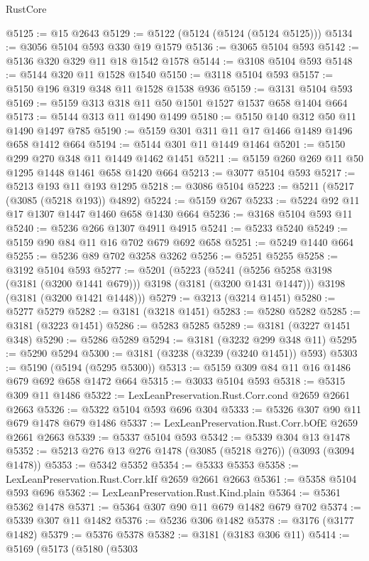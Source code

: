 \begin{lexlean}{RustCore}
\begin{coremodule}
@5125 := @15 @2643
@5129 := @5122 (@5124 (@5124 (@5124 @5125)))
@5134 := @3056 @5104 @593 @330 @19 @1579
@5136 := @3065 @5104 @593
@5142 := @5136 @320 @329 @11 @18 @1542 @1578
@5144 := @3108 @5104 @593
@5148 := @5144 @320 @11 @1528 @1540
@5150 := @3118 @5104 @593
@5157 := @5150 @196 @319 @348 @11 @1528 @1538 @936
@5159 := @3131 @5104 @593
@5169 := @5159 @313 @318 @11 @50 @1501 @1527 @1537 @658 @1404 @664
@5173 := @5144 @313 @11 @1490 @1499
@5180 := @5150 @140 @312 @50 @11 @1490 @1497 @785
@5190 := @5159 @301 @311 @11 @17 @1466 @1489 @1496 @658 @1412 @664
@5194 := @5144 @301 @11 @1449 @1464
@5201 := @5150 @299 @270 @348 @11 @1449 @1462 @1451
@5211 := @5159 @260 @269 @11 @50 @1295 @1448 @1461 @658 @1420 @664
@5213 := @3077 @5104 @593
@5217 := @5213 @193 @11 @193 @1295
@5218 := @3086 @5104
@5223 := @5211 (@5217 (@3085 (@5218 @193)) @4892)
@5224 := @5159 @267
@5233 := @5224 @92 @11 @17 @1307 @1447 @1460 @658 @1430 @664
@5236 := @3168 @5104 @593 @11
@5240 := @5236 @266 @1307 @4911 @4915
@5241 := @5233 @5240
@5249 := @5159 @90 @84 @11 @16 @702 @679 @692 @658
@5251 := @5249 @1440 @664
@5255 := @5236 @89 @702 @3258 @3262
@5256 := @5251 @5255
@5258 := @3192 @5104 @593
@5277 := @5201
    (@5223
      (@5241 (@5256 @5258 @3198 (@3181 (@3200 @1441 @679))) @3198 (@3181 (@3200 @1431 @1447)))
      @3198
      (@3181 (@3200 @1421 @1448)))
@5279 := @3213 (@3214 @1451)
@5280 := @5277 @5279
@5282 := @3181 (@3218 @1451)
@5283 := @5280 @5282
@5285 := @3181 (@3223 @1451)
@5286 := @5283 @5285
@5289 := @3181 (@3227 @1451 @348)
@5290 := @5286 @5289
@5294 := @3181 (@3232 @299 @348 @11)
@5295 := @5290 @5294
@5300 := @3181 (@3238 (@3239 (@3240 @1451)) @593)
@5303 := @5190 (@5194 (@5295 @5300))
@5313 := @5159 @309 @84 @11 @16 @1486 @679 @692 @658 @1472 @664
@5315 := @3033 @5104 @593
@5318 := @5315 @309 @11 @1486
@5322 := LexLeanPreservation.Rust.Corr.cond @2659 @2661 @2663
@5326 := @5322 @5104 @593 @696 @304
@5333 := @5326 @307 @90 @11 @679 @1478 @679 @1486
@5337 := LexLeanPreservation.Rust.Corr.bOfE @2659 @2661 @2663
@5339 := @5337 @5104 @593
@5342 := @5339 @304 @13 @1478
@5352 := @5213 @276 @13 @276 @1478 (@3085 (@5218 @276)) (@3093 (@3094 @1478))
@5353 := @5342 @5352
@5354 := @5333 @5353
@5358 := LexLeanPreservation.Rust.Corr.kIf @2659 @2661 @2663
@5361 := @5358 @5104 @593 @696
@5362 := LexLeanPreservation.Rust.Kind.plain
@5364 := @5361 @5362 @1478
@5371 := @5364 @307 @90 @11 @679 @1482 @679 @702
@5374 := @5339 @307 @11 @1482
@5376 := @5236 @306 @1482
@5378 := @3176 (@3177 @1482)
@5379 := @5376 @5378
@5382 := @3181 (@3183 @306 @11)
@5414 := @5169
    (@5173
      (@5180
        (@5303

\end{coremodule}
\end{lexlean}
